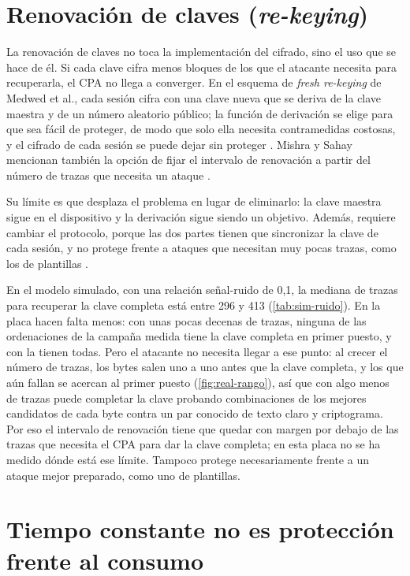 \section{Renovación de claves (\emph{re-keying})}
\label{sec:rekeying}

La renovación de claves no toca la implementación del cifrado, sino el uso que
se hace de él. Si cada clave cifra menos bloques de los que el atacante
necesita para recuperarla, el CPA no llega a converger. En el esquema de
\emph{fresh re-keying} de Medwed et al., cada sesión cifra con una clave nueva
que se deriva de la clave maestra y de un número aleatorio público; la función
de derivación se elige para que sea fácil de proteger, de modo que solo ella
necesita contramedidas costosas, y el cifrado de cada sesión se puede dejar sin
proteger \cite{medwed2010fresh}. Mishra y Sahay mencionan también la opción de
fijar el intervalo de renovación a partir del número de trazas que necesita un
ataque \cite[sec.~II.C.5]{mishra2025modern}.

Su límite es que desplaza el problema en lugar de eliminarlo: la clave maestra
sigue en el dispositivo y la derivación sigue siendo un objetivo. Además,
requiere cambiar el protocolo, porque las dos partes tienen que sincronizar la
clave de cada sesión, y no protege frente a ataques que necesitan muy pocas
trazas, como los de plantillas \cite[sec.~II.B.4]{mishra2025modern}.

En el modelo simulado, con una relación señal-ruido de 0,1, la mediana de
trazas para recuperar la clave completa está entre 296 y 413
(\cref{tab:sim-ruido}). En la placa hacen falta menos: con unas pocas decenas
de trazas, ninguna de las ordenaciones de la campaña medida tiene la clave
completa en primer puesto, y con \realTracesAll{} la tienen todas. Pero el
atacante no necesita llegar a ese punto: al crecer el número de trazas, los
bytes salen uno a uno antes que la clave completa, y los que aún fallan se
acercan al primer puesto (\cref{fig:real-rango}), así que con algo menos de
trazas puede completar la clave probando combinaciones de los mejores
candidatos de cada byte contra un par conocido de texto claro y criptograma.
Por eso el intervalo de renovación tiene que quedar con margen por debajo de
las trazas que necesita el CPA para dar la clave completa; en esta placa no se
ha medido dónde está ese límite. Tampoco protege necesariamente frente a un
ataque mejor preparado, como uno de plantillas.

\section{Tiempo constante no es protección frente al consumo}
\label{sec:tiempo-constante}

